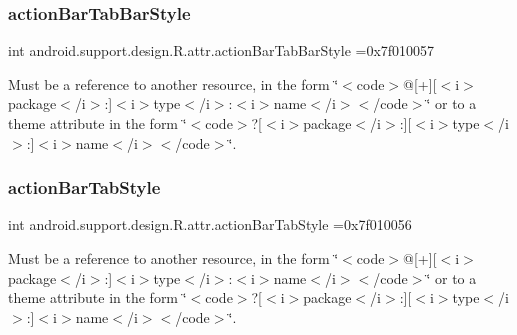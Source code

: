 \subsubsection{\texorpdfstring{action\+Bar\+Tab\+Bar\+Style}{actionBarTabBarStyle}}
{\footnotesize\ttfamily int android.\+support.\+design.\+R.\+attr.\+action\+Bar\+Tab\+Bar\+Style =0x7f010057\hspace{0.3cm}{\ttfamily [static]}}

Must be a reference to another resource, in the form \char`\"{}$<$code$>$@\mbox{[}+\mbox{]}\mbox{[}$<$i$>$package$<$/i$>$\+:\mbox{]}$<$i$>$type$<$/i$>$\+:$<$i$>$name$<$/i$>$$<$/code$>$\char`\"{} or to a theme attribute in the form \char`\"{}$<$code$>$?\mbox{[}$<$i$>$package$<$/i$>$\+:\mbox{]}\mbox{[}$<$i$>$type$<$/i$>$\+:\mbox{]}$<$i$>$name$<$/i$>$$<$/code$>$\char`\"{}. \mbox{\label{classandroid_1_1support_1_1design_1_1R_1_1attr_acf3735cc1f6496c4924b89004afa2e4f}} 
\subsubsection{\texorpdfstring{action\+Bar\+Tab\+Style}{actionBarTabStyle}}
{\footnotesize\ttfamily int android.\+support.\+design.\+R.\+attr.\+action\+Bar\+Tab\+Style =0x7f010056\hspace{0.3cm}{\ttfamily [static]}}

Must be a reference to another resource, in the form \char`\"{}$<$code$>$@\mbox{[}+\mbox{]}\mbox{[}$<$i$>$package$<$/i$>$\+:\mbox{]}$<$i$>$type$<$/i$>$\+:$<$i$>$name$<$/i$>$$<$/code$>$\char`\"{} or to a theme attribute in the form \char`\"{}$<$code$>$?\mbox{[}$<$i$>$package$<$/i$>$\+:\mbox{]}\mbox{[}$<$i$>$type$<$/i$>$\+:\mbox{]}$<$i$>$name$<$/i$>$$<$/code$>$\char`\"{}. \mbox{\label{classandroid_1_1support_1_1design_1_1R_1_1attr_aa71a022be5ee164ec1d42d561579b45d}} 
